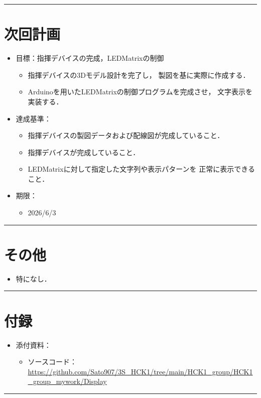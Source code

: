 \documentclass[uplatex,dvipdfmx,a4paper,11pt]{jsarticle}
\newcommand{\sectionrule}{\par\medskip\noindent\rule{\linewidth}{0.6pt}\par\medskip}
\begin{document}
\sectionrule


\section{次回計画}


\begin{itemize}

  \item 目標：指揮デバイスの完成，LEDMatrixの制御
    \begin{itemize}
      \item 指揮デバイスの3Dモデル設計を完了し，
      製図を基に実際に作成する．

      \item Arduinoを用いたLEDMatrixの制御プログラムを完成させ，
      文字表示を実装する．

    \end{itemize}

  \item 達成基準：
    \begin{itemize}
      \item 指揮デバイスの製図データおよび配線図が完成していること．
      \item 指揮デバイスが完成していること．

      \item LEDMatrixに対して指定した文字列や表示パターンを
      正常に表示できること．

  
    \end{itemize}

  \item 期限：
    \begin{itemize}
      \item 2026/6/3
    \end{itemize}

\end{itemize}


\sectionrule


\section{その他}

\begin{itemize}
  \item {}特になし．
\end{itemize}

\sectionrule


\section{付録}

\begin{itemize}
  \item 添付資料：
    \begin{itemize}
      \item ソースコード：\url{https://github.com/Sato907/3S_HCK1/tree/main/HCK1_group/HCK1_group_mywork/Display}
    \end{itemize}

\end{itemize}

\sectionrule
\end{document}
